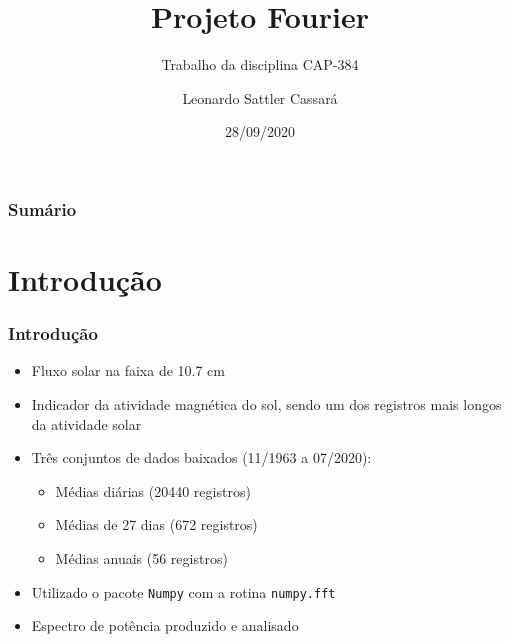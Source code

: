 \documentclass{beamer}
\title{Projeto Fourier}
\subtitle{Trabalho da disciplina CAP-384}
\author{Leonardo Sattler Cassará}
\institute{INPE}
\date{28/09/2020}
\begin{document}
\begin{frame}
\titlepage
\end{frame}

\begin{frame}
\label{contents}
\frametitle{Sumário}
\tableofcontents
\end{frame}

\section{Introdução}

\begin{frame}
\frametitle{Introdução}
\begin{itemize}
\item Fluxo solar na faixa de 10.7 cm
\item Indicador da atividade magnética do sol, sendo um dos registros mais longos da atividade solar 
\item Três conjuntos de dados baixados (11/1963 a 07/2020):
\begin{itemize}
\item Médias diárias (20440 registros)
\item Médias de 27 dias (672 registros)
\item Médias anuais (56 registros)
\end{itemize}
\item Utilizado o pacote \texttt{Numpy} com a rotina \texttt{numpy.fft}
\item Espectro de potência produzido e analisado
\end{itemize}
\end{frame}

\end{document}
